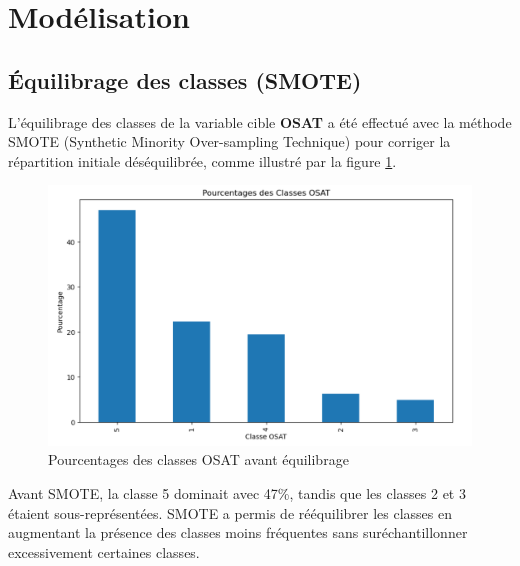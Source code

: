 


\section{Modélisation}
\subsection{Équilibrage des classes (SMOTE)}

L'équilibrage des classes de la variable cible \textbf{OSAT} a été effectué avec la méthode SMOTE (Synthetic Minority Over-sampling Technique) pour corriger la répartition initiale déséquilibrée, comme illustré par la figure \ref{smote_avant}.

\begin{figure}[H]
    \centering
    \includegraphics[width=0.7\linewidth]{capture_sas_57.png}
    \caption{Pourcentages des classes OSAT avant équilibrage}
    \label{smote_avant}
\end{figure}

Avant SMOTE, la classe 5 dominait avec 47\%, tandis que les classes 2 et 3 étaient sous-représentées. SMOTE a permis de rééquilibrer les classes en augmentant la présence des classes moins fréquentes sans suréchantillonner excessivement certaines classes.

